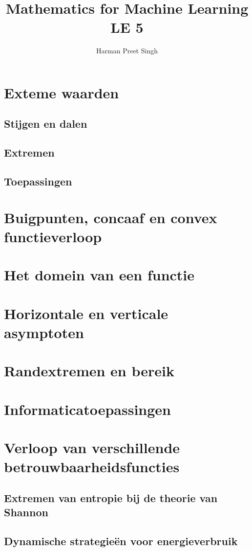 \documentclass[a4paper, 12pt]{article}
\title{Mathematics for Machine Learning \textemdash{} LE 5}
\author{Harman Preet Singh}
\begin{document}

\maketitle
\tableofcontents

\section{Exteme waarden}
\subsection{Stijgen en dalen}
\subsection{Extremen}
\subsection{Toepassingen}

\section{Buigpunten, concaaf en convex functieverloop}
\section{Het domein van een functie}
\section{Horizontale en verticale asymptoten}
\section{Randextremen en bereik}

\section{Informaticatoepassingen}
\section{Verloop van verschillende betrouwbaarheidsfuncties}
\subsection{Extremen van entropie bij de theorie van Shannon}
\subsection{Dynamische strategieën voor energieverbruik}
\end{document}
